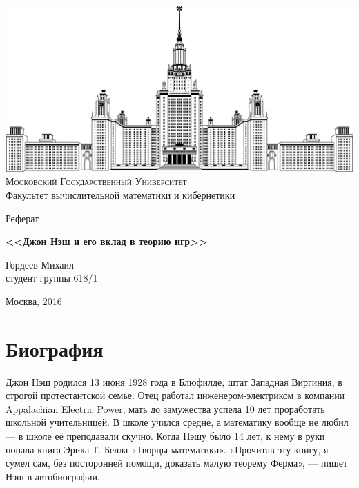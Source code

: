 \documentclass[14pt, a4paper]{extarticle}
\let\stdsection\section
\renewcommand\section{\newpage\stdsection}
\begin{document}
\thispagestyle {empty}

\begin {center}
\ \vspace{-4cm}

\includegraphics [width = 0.5 \textwidth] {msu.png} \\
{\scshape Московский Государственный Университет} \\
Факультет вычислительной математики и кибернетики\\

\vspace {5cm}

{\LARGE Реферат}

\vspace {1cm}

{\Huge \bfseries
<<Джон Нэш и его вклад в теорию игр>> \\}
\end {center}

\vfill
\vfill

\begin {flushright}
  \large
  Гордеев Михаил \\
  студент группы 618/1 \\

  \vspace {5mm}
\end {flushright}

\vfill

\begin {center}
Москва, 2016
\end {center}

\enlargethispage {4 \baselineskip}

\tableofcontents

\section{Биография}
Джон Нэш родился 13 июня 1928 года в Блюфилде, штат Западная Виргиния,
в строгой протестантской семье. Отец работал инженером-электриком в компании
Appalachian Electric Power, мать до замужества успела 10 лет проработать
школьной учительницей. В школе учился средне, а математику вообще не 
любил — в школе её преподавали скучно. Когда Нэшу было 14 лет, к нему в руки 
попала книга Эрика Т. Белла «Творцы математики»\cite{eb79}.
«Прочитав эту книгу, я сумел сам, без посторонней помощи, доказать малую
теорему Ферма», — пишет Нэш в автобиографии.
\end{document}
